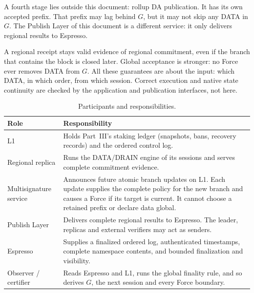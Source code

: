 \documentclass[11pt,a4paper]{article}
\begin{document}
A fourth stage lies outside this document: rollup DA publication. It
has its own accepted prefix. That prefix may lag behind $G$, but it may
not skip any DATA in $G$. The Publish Layer of this document is a
different service: it only delivers regional results to Espresso.

A regional receipt stays valid evidence of regional commitment, even if
the branch that contains the block is closed later. Global acceptance is
stronger: no Force ever removes DATA from $G$. All these guarantees are
about the input: which DATA, in which order, from which session. Correct
execution and native state continuity are checked by the application and
publication interfaces, not here.

\begin{table}[htbp]\centering\small
\caption{Participants and responsibilities.}\label{tab:roles}
\begin{tabularx}{\linewidth}{@{}>{\raggedright\arraybackslash}p{.19\linewidth}Y@{}}\toprule
Role & Responsibility\\\midrule
L1 & Holds Part~III's staking ledger (snapshots, bans, recovery records) and the ordered control log.\\
Regional replica & Runs the DATA/DRAIN engine of its sessions and
serves complete commitment evidence.\\
Multisignature service & Announces future atomic branch updates on L1.
Each update supplies the complete policy for the new branch and causes a
Force if its target is current. It cannot choose a retained prefix or
declare data global.\\
Publish Layer & Delivers complete regional results to Espresso. The
leader, replicas and external verifiers may act as senders.\\
Espresso & Supplies a finalized ordered log, authenticated timestamps,
complete namespace contents, and bounded finalization and visibility.\\
Observer / certifier & Reads Espresso and L1, runs the global finality
rule, and so derives $G$, the next session and every Force boundary.\\
\bottomrule
\end{tabularx}
\end{table}
\end{document}

